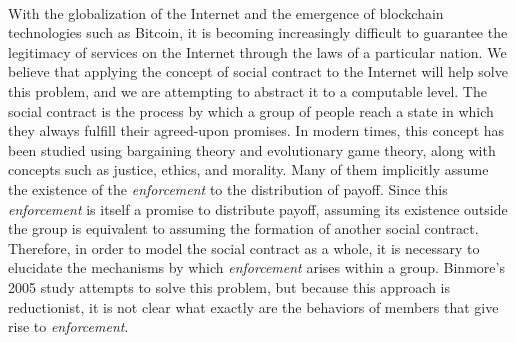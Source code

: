 ~ \\
With the globalization of the Internet and the emergence of blockchain technologies such as Bitcoin\cite{nakamoto2008bitcoin},
it is becoming increasingly difficult to guarantee the legitimacy of services on the Internet through the laws of a particular nation.
We believe that applying the concept of social contract to the Internet will help solve this problem, 
and we are attempting to abstract it to a computable level.
The social contract is the process by which a group of people reach a state in which they always fulfill their agreed-upon promises. 
In modern times, this concept has been studied using bargaining theory and evolutionary game theory, 
along with concepts such as justice, ethics, and morality\cite{sep-game-ethics}. 
Many of them implicitly assume the existence of the \emph{enforcement} to the distribution of payoff.
Since this \emph{enforcement} is itself a promise to distribute payoff, 
assuming its existence outside the group is equivalent to assuming the formation of another social contract.
Therefore, in order to model the social contract as a whole, 
it is necessary to elucidate the mechanisms by which \emph{enforcement} arises within a group.
Binmore's 2005\cite{binmore2005} study attempts to solve this problem, 
but because this approach is reductionist, 
it is not clear what exactly are the behaviors of members that give rise to \emph{enforcement}.
